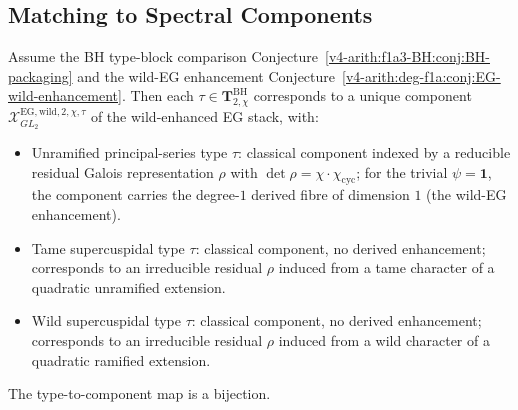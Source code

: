 \subsection{Matching to Spectral Components}

\begin{proposition}[type-to-component match at \(p=2\)]
\label{v4-arith:f1a3-BH:prop:type-to-component-p2}
Assume the BH type-block comparison
Conjecture~\ref{v4-arith:f1a3-BH:conj:BH-packaging} and the wild-EG enhancement
Conjecture~\ref{v4-arith:deg-f1a:conj:EG-wild-enhancement}. Then each
\(\tau\in\mathbf{T}^{\mathrm{BH}}_{2,\chi}\) corresponds to a unique
component \(\mathcal{X}^{\mathrm{EG,wild},2,\chi,\tau}_{GL_{2}}\) of the
wild-enhanced EG stack, with:
\begin{itemize}
\item Unramified principal-series type \(\tau\): classical component
indexed by a reducible residual Galois representation \(\rho\) with
\(\det\rho=\chi\cdot\chi_{\mathrm{cyc}}\); for the trivial \(\psi=\mathbf{1}\),
the component carries the degree-\(1\) derived fibre of dimension \(1\)
(the wild-EG enhancement).
\item Tame supercuspidal type \(\tau\): classical component, no derived
enhancement; corresponds to an irreducible residual \(\rho\) induced
from a tame character of a quadratic unramified extension.
\item Wild supercuspidal type \(\tau\): classical component, no derived
enhancement; corresponds to an irreducible residual \(\rho\) induced
from a wild character of a quadratic ramified extension.
\end{itemize}
The type-to-component map is a bijection.
\end{proposition}

